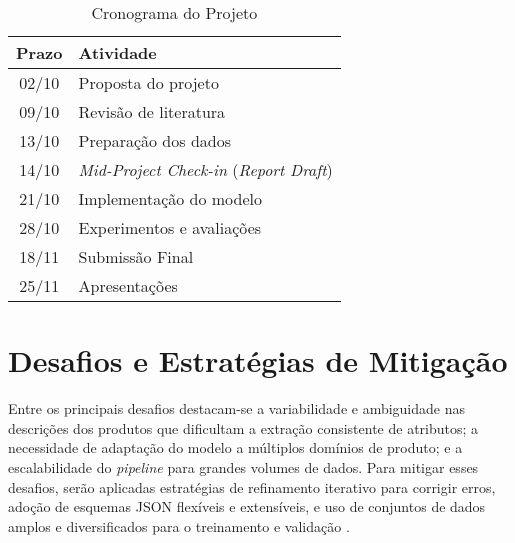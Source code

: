 \begin{table}[htbp] \centering
    \caption{Cronograma do Projeto} \label{tab:cronograma}
    \begin{tabular}{cl}
        \toprule
        \textbf{Prazo} & \textbf{Atividade}                                    \\
        \midrule
        02/10          & Proposta do projeto                                   \\
        09/10          & Revisão de literatura                                 \\
        13/10          & Preparação dos dados                                  \\
        14/10          & \textit{Mid-Project Check-in} (\textit{Report Draft}) \\
        21/10          & Implementação do modelo                               \\
        28/10          & Experimentos e avaliações                             \\
        18/11          & Submissão Final                                       \\
        25/11          & Apresentações                                         \\
        \bottomrule
    \end{tabular}
\end{table}





\appendix

\section{Desafios e Estratégias de Mitigação} %

Entre os principais desafios destacam-se a variabilidade e ambiguidade nas descrições dos produtos que dificultam a extração consistente de atributos; a necessidade de adaptação do modelo a múltiplos domínios de produto; e a escalabilidade do \textit{pipeline} para grandes volumes de dados. Para mitigar esses desafios, serão aplicadas estratégias de refinamento iterativo para corrigir erros, adoção de esquemas JSON flexíveis e extensíveis, e uso de conjuntos de dados amplos e diversificados para o treinamento e validação \citet{SelfRefinementLLM2024}.



